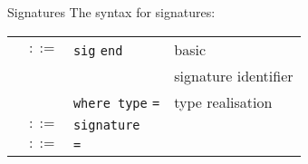 \begin{grammar}{Signatures}
The syntax for signatures:
\begin{longtable}{rcll}
\label{grammar:sigexp}\nonterminal{sigexp} & $::=$ & \texttt{sig} \nonterminal{spec} \texttt{end} & basic\\
  &\alt& \nonterminal{sigid} & signature identifier\\
&\alt&\nonterminal{sigexp} \texttt{where type} \nonterminal{tyvarseq} \nonterminal{longtycon}
\texttt{=} \nonterminal{ty} & type realisation\\
\label{grammar:sigdec}\nonterminal{sigdec} & $::=$ & \texttt{signature} \nonterminal{sigbind} & \\
\label{grammar:sigbind}\nonterminal{sigbind} & $::=$
& \nonterminal{sigid} \texttt{=} \nonterminal{sigexp}
\optional{\texttt{and} \nonterminal{sigbind}} & \\
\end{longtable}
\end{grammar}

